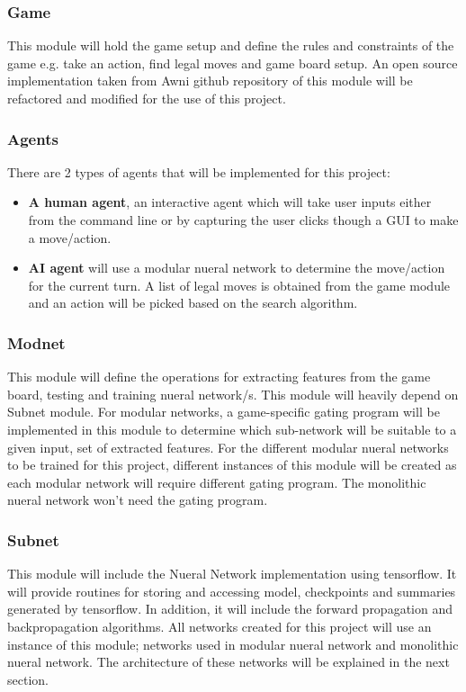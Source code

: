 \documentclass[12pt,a4paper]{article}
\begin{document}
\subsubsection{Game}
This module will hold the game setup and define the rules and constraints of the game e.g. take an action, find legal moves and game board setup. An open source implementation taken from Awni github repository of this module will be refactored and modified for the use of this project. 

\subsubsection{Agents}
There are 2 types of agents that will be implemented for this project: 
\begin{itemize}
    \item \textbf{A human agent}, an interactive agent which will take user inputs either from the command line or by capturing the user clicks though a GUI to make a move/action.
    \item \textbf{AI agent} will use a modular nueral network to determine the move/action for the current turn. A list of legal moves is obtained from the game module and an action will be picked based on the search algorithm.
\end{itemize}

\subsubsection{Modnet}
This module will define the operations for extracting features from the game board, testing and training nueral network/s. This module will heavily depend on Subnet module. For modular networks, a game-specific gating program will be implemented in this module to determine which sub-network will be suitable to a given input, set of extracted features. For the different modular nueral networks to be trained for this project, different instances of this module will be created as each modular network will require different gating program. The monolithic nueral network won't need the gating program.

\subsubsection{Subnet}
This module will include the Nueral Network implementation using tensorflow. It will provide routines for storing and accessing model, checkpoints and summaries generated by tensorflow. In addition, it will include the forward propagation and backpropagation algorithms. All networks created for this project will use an instance of this module; networks used in modular nueral network and monolithic nueral network. The architecture of these networks will be explained in the next section.
\end{document}
